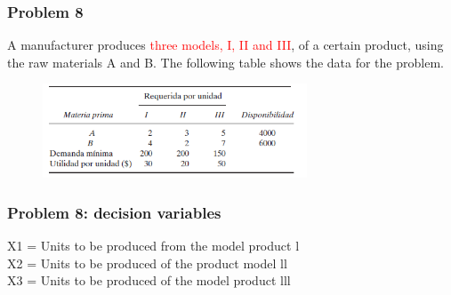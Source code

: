 \documentclass[10pt,svgnames,fragile]{beamer}
\begin{document}
\begin{frame}
\frametitle{Problem 8}


A manufacturer produces \textcolor{red}{three models, I, II and III}, of a certain product, using the raw materials A and B. The following table shows the data for the problem.
\begin{figure}
\includegraphics[width=0.7\textwidth]{images/io4.PNG}
\end{figure}


\end{frame}


\begin{frame}[label={sec:orge9abdcb}]{}
\frametitle{Problem 8: decision variables }

X1 = Units to be produced from the model product l\\

X2 = Units to be produced of the product model ll\\

X3 = Units to be produced of the model product lll

\end{frame}
\end{document}
